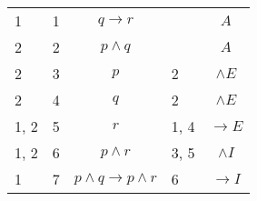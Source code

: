 \documentclass{article}
\begin{document}
\begin{table}[htbp]
\begin{tabular}{lllll}
{1} & 1 & $$q→r$$ & {} & $$A$$ \\
{2} & 2 & $$p∧q$$ & {} & $$A$$ \\
{2} & 3 & $$p$$ & {2} & $$∧E$$ \\
{2} & 4 & $$q$$ & {2} & $$∧E$$ \\
{1, 2} & 5 & $$r$$ & {1, 4} & $$→E$$ \\
{1, 2} & 6 & $$p∧r$$ & {3, 5} & $$∧I$$ \\
{1} & 7 & $$p∧q→p∧r$$ & {6} & $$→I$$ \\
\end{tabular}
\end{table}
\end{document}
